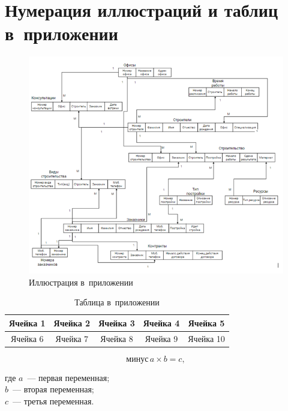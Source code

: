 \documentclass{SIBGU-state}
\begin{document}
\section{Нумерация иллюстраций и таблиц в~приложении}
\label{appendix:fig_tab_eq_numeration}

\begin{figure}[htb]
	\centering
	\includegraphics[width=.5\textwidth]{ris/ris3.png}
	\parskip=6pt
	\caption{Иллюстрация в~приложении}
	\label{fig:in_appendix}
\end{figure}

\begin{table}[htb]
	\caption{Таблица в~приложении}
	\centering
	\begin{tabular}{ |c|c|c|c|c| } 
		\hline
		Ячейка 1 & Ячейка 2 & Ячейка 3 & Ячейка 4 & Ячейка 5 \\ \hline
		Ячейка 6 & Ячейка 7 & Ячейка 8 & Ячейка 9 & Ячейка 10 \\ \hline
	\end{tabular}
	\label{tab:in_appendix}
\end{table}

\begin{equation}\label{eq:in_appendix}
	\text{минус}\,a\times b=c ,
\end{equation}

где $a$~--- первая переменная; \\
$b$~--- вторая переменная; \\
$c$~--- третья переменная.
\end{document}
